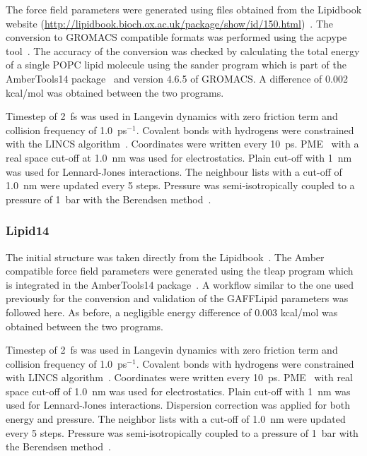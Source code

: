 \documentclass[pre,aps,floatfix,authordate1-4,twocolumn]{revtex4-1}
\begin{document}
The force field parameters were generated using files obtained from the Lipidbook website (\url{http://lipidbook.bioch.ox.ac.uk/package/show/id/150.html})~\cite{domanski10}. 
The conversion to GROMACS compatible formats was performed using the acpype tool~\cite{silva12}. The accuracy of the conversion was checked by calculating 
the total energy of a single POPC lipid molecule using the sander program which is part of the AmberTools14 package~\cite{ferrer13} and version 4.6.5 of GROMACS. 
A difference of 0.002 kcal/mol was obtained between the two programs.

Timestep of 2~fs was used in Langevin dynamics with zero friction term and collision frequency of 1.0~ps$^{-1}$. 
Covalent bonds with hydrogens were constrained with the LINCS algorithm~\cite{hess97,hess07}.
Coordinates were written every 10~ps. PME~\cite{darden93,essman95} with a real space cut-off at 1.0~nm was used 
for electrostatics. Plain cut-off with 1~nm was used for Lennard-Jones interactions. 
The neighbour lists with a cut-off of 1.0~nm were updated every 5 steps. 
Pressure was semi-isotropically coupled to a pressure of 1~bar with the Berendsen method~\cite{berendsen84}.

\subsubsection{Lipid14}
The initial structure was taken directly from the Lipidbook~\cite{domanski10}.
The Amber compatible force field parameters were generated using the tleap program which is integrated in the AmberTools14 package~\cite{ferrer13}. 
A workflow similar to the one used previously for the conversion and validation of the GAFFLipid parameters was followed here. 
As before, a negligible energy difference of 0.003 kcal/mol was obtained between the two programs.

Timestep of 2~fs was used in Langevin dynamics with zero friction term and collision frequency of 1.0~ps$^{-1}$. 
Covalent bonds with hydrogens were constrained with LINCS algorithm~\cite{hess97,hess07}.
Coordinates were written every 10~ps. PME~\cite{darden93,essman95} with real space cut-off of 1.0~nm was used 
for electrostatics. Plain cut-off with 1~nm was used for Lennard-Jones interactions. Dispersion correction
was applied for both energy and pressure. The neighbor lists with a cut-off of 1.0~nm were updated every 5 steps. 
Pressure was semi-isotropically coupled to a pressure of 1~bar with the Berendsen method~\cite{berendsen84}.
\end{document}
